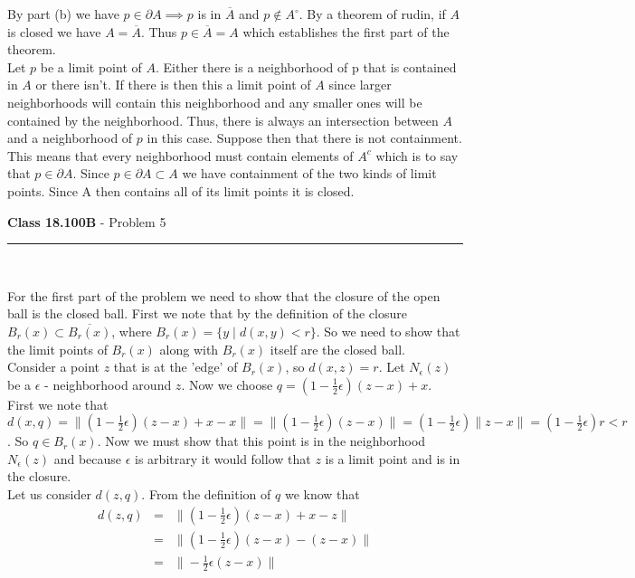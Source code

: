 \documentclass[11pt,reqno]{article}
\begin{document}
By part (b) we have $p \in \partial A \implies p$ is in $\overline{A}$ and $p \notin A^\circ$. By a theorem of rudin, if $A$ is closed we have $A = \overline{A}$. Thus $p \in \overline{A} = A$ which establishes the first part of the theorem.\\ 
\indent Let $p$ be a limit point of $A$. Either there is a neighborhood of p that is contained in $A$ or there isn't. If there is then this a limit point of $A$ since larger neighborhoods will contain this neighborhood and any smaller ones will be contained by the neighborhood. Thus, there is always an intersection between $A$ and a neighborhood of $p$ in this case. Suppose then that there is not containment. This means that every neighborhood must contain elements of $A^c$ which is to say that $p \in \partial A$. Since $p \in \partial A \subset A$ we have containment of the two kinds of limit points. Since A then contains all of its limit points it is closed.

\vspace{15pt}
\begin{flushleft} 
\textbf{Class 18.100B} - Problem 5\\
\rule{500pt}{1pt}\\
\end{flushleft} 

For the first part of the problem we need to show that the closure of the open ball is the closed ball. First we note that by the definition of the closure $B_r(x) \subset \overline{B_r(x)}$, where $B_r(x) = \{ y \; | \; d(x,y) < r\}$. So we need to show that the limit points of $B_r(x)$ along with $B_r(x)$ itself are the closed ball.  \\
\indent Consider a point $z$ that is at the 'edge' of $B_r(x)$, so $d(x,z) = r$. Let $N_\epsilon(z)$ be a $\epsilon$ - neighborhood around $z$. Now  we choose $q = (1-\frac{1}{2}\epsilon)(z-x)+ x$. \\
\indent First we note that $d(x,q) =\|(1-\frac{1}{2}\epsilon)(z-x)+x - x \| = \|(1-\frac{1}{2}\epsilon)(z-x) \| = (1-\frac{1}{2}\epsilon) \|z - x \| = (1-\frac{1}{2}\epsilon) r < r$. So $q \in B_r(x)$. Now we must show that this point is in the neighborhood $N_\epsilon(z)$ and because $\epsilon$ is arbitrary it would follow that $z$ is a limit point and is in the closure.\\
\indent Let us consider $d(z,q)$. From the definition of $q$ we know that 
\begin{eqnarray*}
d(z,q) & = & \| (1-\frac{1}{2}\epsilon)(z-x) + x -z \| \\
	  & = & \| (1-\frac{1}{2}\epsilon)(z-x) - (z -x) \| \\
	  & = & \| -\frac{1}{2}\epsilon(z-x) \| \\
\end{eqnarray*}
\end{document}
